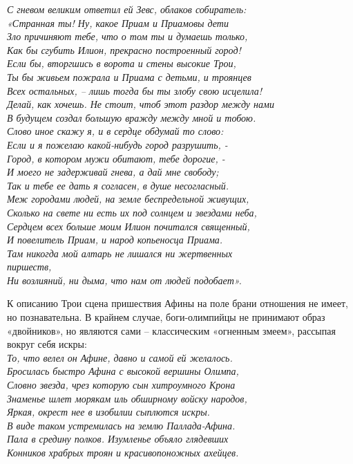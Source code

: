 \noindent
\textit{С гневом великим ответил ей Зевс, облаков собиратель:\\
«Странная ты! Ну, какое Приам и Приамовы дети\\
Зло причиняют тебе, что о том ты и думаешь только,\\
Как бы сгубить Илион, прекрасно построенный город!\\
Если бы, вторгшись в ворота и стены высокие Трои,\\
Ты бы живьем пожрала и Приама с детьми, и троянцев\\
Всех остальных, – лишь тогда бы ты злобу свою исцелила!\\
Делай, как хочешь. Не стоит, чтоб этот раздор между нами\\
В будущем создал большую вражду между мной и тобою.\\
Слово иное скажу я, и в сердце обдумай то слово:\\
Если и я пожелаю какой-нибудь город разрушить, -\\
Город, в котором мужи обитают, тебе дорогие, -\\
И моего не задерживай гнева, а дай мне свободу;\\
Так и тебе ее дать я согласен, в душе несогласный.\\
Меж городами людей, на земле беспредельной живущих,\\
Сколько на свете ни есть их под солнцем и звездами неба,\\
Сердцем всех больше моим Илион почитался священный,\\
И повелитель Приам, и народ копьеносца Приама.\\
Там никогда мой алтарь не лишался ни жертвенных\\ пиршеств,\\
Ни возлияний, ни дыма, что нам от людей подобает».\\}

К описанию Трои сцена пришествия Афины на поле брани отношения не имеет, но познавательна. В крайнем случае, боги-олимпийцы не принимают образ «двойников», но являются сами – классическим «огненным змеем», рассыпая вокруг себя искры:\\

\noindent
\textit{То, что велел он Афине, давно и самой ей желалось.\\
Бросилась быстро Афина с высокой вершины Олимпа,\\
Словно звезда, чрез которую сын хитроумного Крона\\
Знаменье шлет морякам иль обширному войску народов,\\
Яркая, окрест нее в изобилии сыплются искры.\\
В виде таком устремилась на землю Паллада-Афина.\\
Пала в средину полков. Изумленье объяло глядевших\\
Конников храбрых троян и красивопоножных ахейцев.\\}

